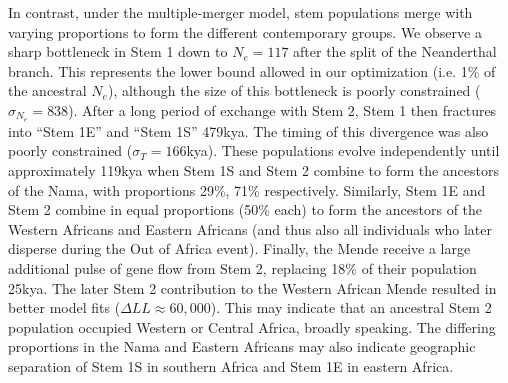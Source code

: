 \documentclass[]{article}
\begin{document}
In contrast, under the multiple-merger model, stem populations merge with
varying proportions to form the different contemporary groups. 
We observe a sharp bottleneck in Stem 1 down to $N_e=117$ after the split of
the Neanderthal branch. This represents the lower bound allowed in our
optimization (i.e. 1\% of the ancestral $N_e$), although the size of this
bottleneck is poorly constrained ($\sigma_{N_e}=838$). After a long period of
exchange with Stem 2, Stem 1 then fractures into ``Stem 1E'' and ``Stem 1S''
479kya. The timing of this divergence was also poorly constrained ($\sigma_T=
166$kya). These populations evolve independently until approximately 119kya
when Stem 1S and Stem 2 combine to form the ancestors of the Nama, with
proportions 29\%, 71\% respectively. Similarly, Stem 1E and Stem 2 combine in
equal proportions (50\% each) to form the ancestors of the Western Africans and
Eastern Africans (and thus also all individuals who later disperse during the
Out of Africa event). Finally, the Mende receive a large additional pulse of
gene flow from Stem 2, replacing 18\% of their population 25kya.
The later Stem 2 contribution to the Western African Mende resulted in
better model fits ($\Delta LL \approx 60,000$).
This may indicate that an ancestral Stem 2 population occupied Western or
Central Africa, broadly speaking. The differing proportions in the Nama and
Eastern Africans may also indicate geographic separation of Stem 1S in southern
Africa and Stem 1E in eastern Africa. 
\end{document}
